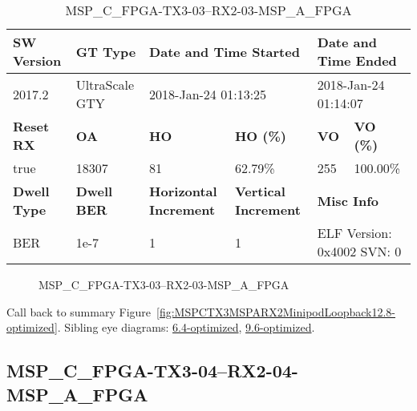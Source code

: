 \begin{table}[h]
\centering
\caption{MSP\_C\_FPGA-TX3-03--RX2-03-MSP\_A\_FPGA}
\label{tab:MSPCFPGATX303RX203MSPAFPGA12.8-optimized}
\begin{tabular}{@{}|l|l|l|l|l|l|@{}}
\toprule
\textbf{SW Version}                & \textbf{GT Type}   & \multicolumn{2}{l|}{\textbf{Date and Time Started}}            & \multicolumn{2}{l|}{\textbf{Date and Time Ended}}        \\ \midrule
2017.2                       & UltraScale GTY          & \multicolumn{2}{l|}{2018-Jan-24 01:13:25}                   & \multicolumn{2}{l|}{2018-Jan-24 01:14:07}               \\ \midrule
\textbf{Reset RX}                  & \textbf{OA} & \textbf{HO}   & \textbf{HO (\%)} & \textbf{VO} & \textbf{VO (\%)} \\ \midrule
true & 18307        & 81          & 62.79\%        & 255        & 100.00\%       \\ \midrule
\textbf{Dwell Type}                & \textbf{Dwell BER} & \textbf{Horizontal Increment} & \textbf{Vertical Increment}    & \multicolumn{2}{l|}{\textbf{Misc Info}}                  \\ \midrule
BER                            & 1e-7        & 1        & 1           & \multicolumn{2}{l|}{ELF Version: 0x4002 SVN: 0}                         \\ \bottomrule
\end{tabular}
\end{table}

\begin{figure}[h]
\caption{MSP\_C\_FPGA-TX3-03--RX2-03-MSP\_A\_FPGA} \label{fig:MSPCFPGATX303RX203MSPAFPGA12.8-optimized}
\end{figure}

Call back to summary Figure~\ref{fig:MSPCTX3MSPARX2MinipodLoopback12.8-optimized}.
Sibling eye diagrams: \hyperref[sec:MSPCFPGATX303RX203MSPAFPGA6.4-optimized]{6.4-optimized}, \hyperref[sec:MSPCFPGATX303RX203MSPAFPGA9.6-optimized]{9.6-optimized}.

\clearpage
\newpage


\subsection{MSP\_C\_FPGA-TX3-04--RX2-04-MSP\_A\_FPGA}\label{sec:MSPCFPGATX304RX204MSPAFPGA12.8-optimized}

